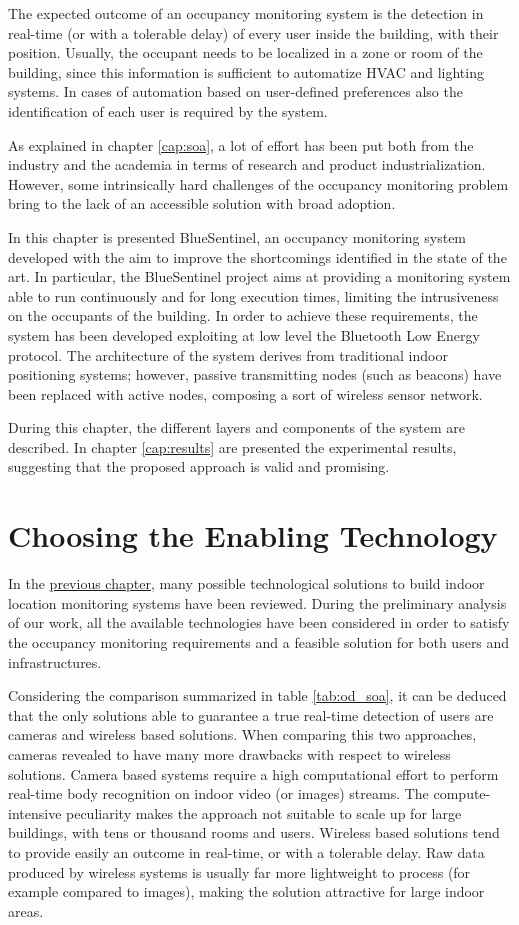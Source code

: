 \medskip
The expected outcome of an occupancy monitoring system is the detection in real-time (or with a tolerable delay) of every user inside the building, with their position. Usually, the occupant needs to be localized in a zone or room of the building, since this information is sufficient to automatize HVAC and lighting systems. In cases of automation based on user-defined preferences also the identification of each user is required by the system.

\smallskip
As explained in chapter \ref{cap:soa}, a lot of effort has been put both from the industry and the academia in terms of research and product industrialization. However, some intrinsically hard challenges of the occupancy monitoring problem bring to the lack of an accessible solution with broad adoption.

In this chapter is presented BlueSentinel, an occupancy monitoring system developed with the aim to improve the shortcomings identified in the state of the art. In particular, the BlueSentinel project aims at providing a monitoring system able to run continuously and for long execution times, limiting the intrusiveness on the occupants of the building. In order to achieve these requirements, the system has been developed exploiting at low level the Bluetooth Low Energy protocol. The architecture of the system derives from traditional indoor positioning systems; however, passive transmitting nodes (such as beacons) have been replaced with active nodes, composing a sort of wireless sensor network.

During this chapter, the different layers and components of the system are described. In chapter \ref{cap:results} are presented the experimental results, suggesting that the proposed approach is valid and promising.

\section{Choosing the Enabling Technology}
\label{sec:technology}
In the {\hyperref[cap:soa]{previous chapter}}, many possible technological solutions to build indoor location monitoring systems have been reviewed. During the preliminary analysis of our work, all the available technologies have been considered in order to satisfy the occupancy monitoring requirements and a feasible solution for both users and infrastructures.

Considering the comparison summarized in table \ref{tab:od_soa}, it can be deduced that the only solutions able to guarantee a true real-time detection of users are cameras and wireless based solutions. When comparing this two approaches, cameras revealed to have many more drawbacks with respect to wireless solutions.
Camera based systems require a high computational effort to perform real-time body recognition on indoor video (or images) streams. The compute-intensive peculiarity makes the approach not suitable to scale up for large buildings, with tens or thousand rooms and users.
Wireless based solutions tend to provide easily an outcome in real-time, or with a tolerable delay. Raw data produced by wireless systems is usually far more lightweight to process (for example compared to images), making the solution attractive for large indoor areas.

